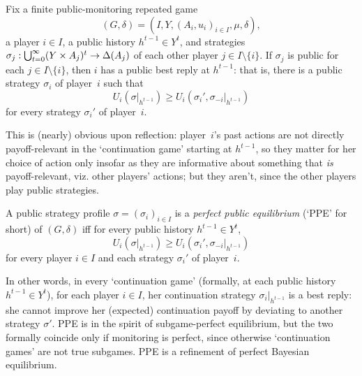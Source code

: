 \begin{observation}
	\label{observation:public_br}
	Fix a finite public-monitoring repeated game
	\begin{equation*}
		(G,\delta) = \left( I, Y, (A_i, u_i)_{i \in I}, \mu, \delta \right) ,
	\end{equation*}
	a player $i \in I$, a public history $h^{t-1} \in Y^t$, and strategies $\sigma_j : \bigcup_{t=0}^\infty (Y \times A_j)^t \to \Delta(A_j)$ of each other player $j \in I \setminus \{i\}$. If $\sigma_j$ is public for each $j \in I \setminus \{i\}$, then $i$ has a public best reply at $h^{t-1}$: that is, there is a public strategy $\sigma_i$ of player~$i$ such that
	\begin{equation*}
		U_i\left( \sigma|_{h^{t-1}} \right) \geq U_i\left( \sigma_i', \sigma_{-i}|_{h^{t-1}} \right)
	\end{equation*}
	for every strategy $\sigma_i'$ of player~$i$.
\end{observation}

This is (nearly) obvious upon reflection: player~$i$'s past actions are not directly payoff-relevant in the `continuation game' starting at $h^{t-1}$, so they matter for her choice of action only insofar as they are informative about something that \emph{is} payoff-relevant, viz. other players' actions; but they aren't, since the other players play public strategies.

\begin{definition}
	\label{definition:ppe}
	A public strategy profile $\sigma = (\sigma_i)_{i \in I}$ is a \emph{perfect public equilibrium} (`PPE' for short) of $(G,\delta)$ iff for every public history $h^{t-1} \in Y^t$,
	\begin{equation*}
		U_i\left( \sigma|_{h^{t-1}} \right)
		\geq U_i\left( \sigma_i', \sigma_{-i}|_{h^{t-1}} \right)
	\end{equation*}
	for every player $i \in I$ and each strategy $\sigma_i'$ of player~$i$.
\end{definition}

In other words, in every `continuation game' (formally, at each public history $h^{t-1} \in Y^t$), for each player $i \in I$, her continuation strategy $\sigma_i|_{h^{t-1}}$ is a best reply: she cannot improve her (expected) continuation payoff by deviating to another strategy $\sigma'$. PPE is in the spirit of subgame-perfect equilibrium, but the two formally coincide only if monitoring is perfect, since otherwise `continuation games' are not true subgames. PPE is a refinement of perfect Bayesian equilibrium.

